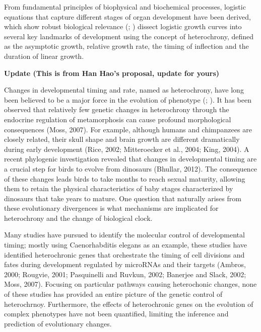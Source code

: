 \documentclass[11pt,]{book}
\theoremstyle{definition}
\theoremstyle{definition}
\theoremstyle{remark}
\begin{document}
From fundamental principles of biophysical and biochemical processes,
logistic equations that capture different stages of organ development
have been derived, which show robust biological relevance
(\cite{west2001general}; \cite{sun2014model}) dissect logistic growth
curves into several key landmarks of development using the concept of
heterochrony, defined as the asymptotic growth, relative growth rate,
the timing of inflection and the duration of linear growth.

\textbf{Update (This is from Han Hao's proposal, update for yours)}

Changes in developmental timing and rate, named as heterochrony, have
long been believed to be a major force in the evolution of phenotype
(\cite{gould1977ontogeny}; \cite{wilson1988heterochrony}). It has been
observed that relatively few genetic changes in heterochrony through the
endocrine regulation of metamorphosis can cause profound morphological
consequences (Moss, 2007). For example, although humans and chimpanzees
are closely related, their skull shape and brain growth are different
dramatically during early development (Rice, 2002; Mitteroecker et al.,
2004; King, 2004). A recent phylogenic investigation revealed that
changes in developmental timing are a crucial step for birds to evolve
from dinosaurs (Bhullar, 2012). The consequence of these changes leads
birds to take months to reach sexual maturity, allowing them to retain
the physical characteristics of baby stages characterized by dinosaurs
that take years to mature. One question that naturally arises from these
evolutionary divergences is what mechanisms are implicated for
heterochrony and the change of biological clock.

Many studies have pursued to identify the molecular control of
developmental timing; mostly using Caenorhabditis elegans as an example,
these studies have identified heterochronic genes that orchestrate the
timing of cell divisions and fates during development regulated by
microRNAs and their targets (Ambros, 2000; Rougvie, 2001; Pasquinelli
and Ruvkun, 2002; Banerjee and Slack, 2002; Moss, 2007). Focusing on
particular pathways causing heterochonic changes, none of these studies
has provided an entire picture of the genetic control of heterochrnoy.
Furthermore, the effects of heterochronic genes on the evolution of
complex phenotypes have not been quantified, limiting the inference and
prediction of evolutionary changes.
\end{document}
